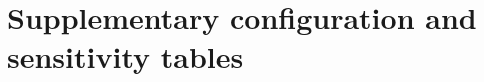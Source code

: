 \documentclass[preprint,12pt,numbers,sort&compress]{elsarticle}
\begin{document}
\clearpage
\appendix
\section{Supplementary configuration and sensitivity tables}
\label{sec:appendix}










\end{document}
